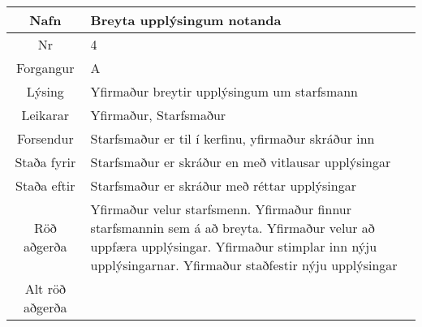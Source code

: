 \documentclass[a4paper]{article}
\begin{document}
\begin{tabular}{|c|p{10cm}|}
\hline
Nafn&Breyta upplýsingum notanda\\
\hline
Nr&4\\
\hline
Forgangur&A\\
\hline
Lýsing&Yfirmaður breytir upplýsingum um starfsmann\\
\hline
Leikarar&Yfirmaður, Starfsmaður\\
\hline
Forsendur&Starfsmaður er til í kerfinu, yfirmaður skráður inn\\
\hline
Staða fyrir&Starfsmaður er skráður en með vitlausar upplýsingar\\
\hline
Staða eftir&Starfsmaður er skráður með réttar upplýsingar\\
\hline
Röð aðgerða&Yfirmaður velur starfsmenn. Yfirmaður finnur starfsmannin sem á að breyta. Yfirmaður velur að uppfæra upplýsingar. Yfirmaður stimplar inn nýju upplýsingarnar. Yfirmaður staðfestir nýju upplýsingar\\
\hline
Alt röð aðgerða&\\
\hline
\end{tabular}
\end{document}
